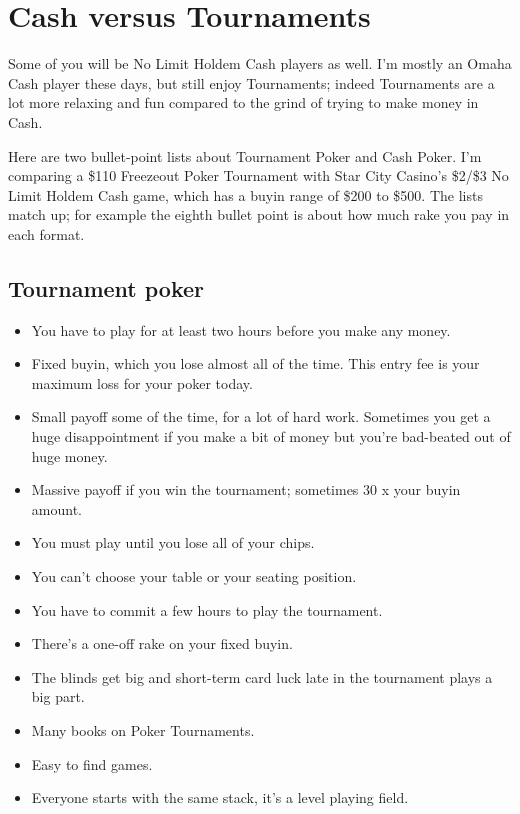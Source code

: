 \chapter{Cash versus Tournaments}

Some of you will be No Limit Holdem Cash players as well. I'm mostly
an Omaha Cash player these days, but still enjoy Tournaments; indeed
Tournaments are a lot more relaxing and fun compared to the grind of
trying to make money in Cash.

Here are two bullet-point lists about Tournament Poker and Cash
Poker. I'm comparing a \$110 Freezeout Poker Tournament with Star City
Casino's \$2/\$3 No Limit Holdem Cash game, which has a buyin range of
\$200 to \$500. The lists match up; for example the eighth bullet
point is about how much rake you pay in each format.

\section{Tournament poker}

\begin{itemize}
  \item You have to play for at least two hours before you make any money.
  \item Fixed buyin, which you lose almost all of the time. This entry
    fee is your maximum loss for your poker today.
  \item Small payoff some of the time, for a lot of hard
    work. Sometimes you get a huge disappointment if you make a bit of
    money but you're bad-beated out of huge money.
  \item Massive payoff if you win the tournament; sometimes 30 x your
    buyin amount.
  \item You must play until you lose all of your chips.
  \item You can't choose your table or your seating position.
  \item You have to commit a few hours to play the tournament.
  \item There's a one-off rake on your fixed buyin.
  \item The blinds get big and short-term card luck late in the
    tournament plays a big part.
  \item Many books on Poker Tournaments.
  \item Easy to find games.
  \item Everyone starts with the same stack, it's a level playing field.
\end{itemize}

